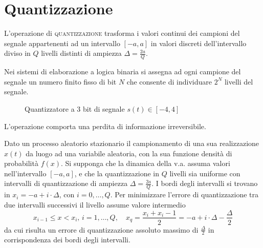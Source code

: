 \section{Quantizzazione}
L'operazione di \textsc{quantizzazione} trasforma i valori continui dei campioni del segnale appartenenti ad un intervallo $[-a,a]$ in valori discreti  dell'intervallo diviso in $Q$ livelli distinti di ampiezza $\Delta=\frac{2a}{Q}$.

Nei sistemi di elaborazione a logica binaria si assegna ad ogni campione del segnale un numero finito fisso di bit $N$ che consente di individuare $2^N$ livelli del segnale.

\begin{figure}[!h]
\centering
{}
\caption{Quantizzatore a 3 bit di segnale $s(t)\in[-4,4]$}
\end{figure}

L'operazione comporta una perdita di informazione irreversibile.

Dato un processo aleatorio stazionario il campionamento di una sua realizzazione $x(t)$ da luogo ad una variabile aleatoria, con la sua funzione densità di probabilità $f(x)$. Si supponga che la dinamica della v.a. assuma valori nell'intervallo $[-a,a]$, e che la quantizzazione in $Q$ livelli sia uniforme con intervalli di quantizzazione di ampiezza $\Delta=\frac{2a}{Q}$. I bordi degli intervalli si trovano in $x_i=-a+i\cdot\Delta$, con $i=0,\dots,Q$.  Per minimizzare l'errore di quantizzazione tra due intervalli successivi il livello assume valore intermedio
\begin{equation}
x_{i-1}\leq x<x_i,\,i=1,\dots,Q,\quad
x_q=\frac{x_i+x_i-1}{2}=-a+i\cdot\Delta-\frac{\Delta}{2}
\end{equation}
da cui risulta un errore di quantizzazione assoluto massimo di $\frac{\Delta}{2}$ in corrispondenza dei bordi degli intervalli.

